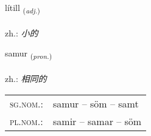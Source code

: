 \documentclass[frontgrid, backgrid]{flacards}\usepackage[]{graphicx}\usepackage[]{xcolor}
\begin{document}
\renewcommand{\flhead}{\vskip5pt \fboxsep=0pt {\small\bfseries\footnotesize Lýsingarorð | 形容词}}
\renewcommand{\fcfoot}{\vskip5pt \fboxsep=0pt \hspace{2pt}{\small\bfseries\footnotesize 1K}}

\renewcommand{\blhead}{\vskip5pt {\small\bfseries\footnotesize Lýsingarorð | 形容词 }}
\renewcommand{\bcfoot}{\vskip5pt \hspace{2pt}{\small\bfseries\footnotesize 1K}}


{lítill \small{\textsubscript{(\textit{adj.})}} \\[1ex] %
\textphonetic{[liːtɪtl̥]} \\
zh.: \emph{小的} \\  [2ex]
\renewcommand*{\arraystretch}{0.8}
}

\renewcommand{\flhead}{\vskip5pt \fboxsep=0pt {\small\bfseries\footnotesize Fornafn | 代词}}
\renewcommand{\fcfoot}{\vskip5pt \fboxsep=0pt \hspace{2pt}{\small\bfseries\footnotesize 1K}}

\renewcommand{\blhead}{\vskip5pt {\small\bfseries\footnotesize Fornafn | 代词 }}
\renewcommand{\bcfoot}{\vskip5pt \hspace{2pt}{\small\bfseries\footnotesize 1K}}


{samur \small{\textsubscript{(\textit{pron.})}} \\[1ex] %
\textphonetic{[saːmʏr]} \\
zh.: \emph{相同的} \\  [2ex]
\renewcommand*{\arraystretch}{0.8}
\begin{tabular}{ll}
\textsc{sg.nom.}: & samur  --  söm -- samt \\ 
\textsc{pl.nom.}: & samir -- samar -- söm
\end{tabular}
}
\end{document}
